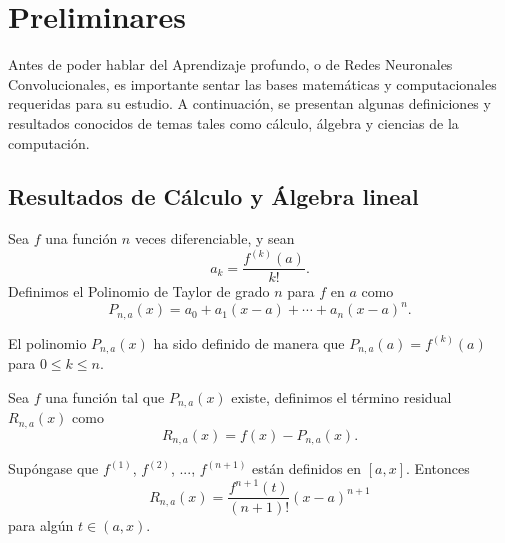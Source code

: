     \chapter{Preliminares}
    Antes de poder hablar del Aprendizaje profundo, o de Redes Neuronales Convolucionales, es importante sentar las bases matemáticas y computacionales requeridas para su estudio. A continuación, se presentan algunas definiciones y resultados conocidos de temas tales como cálculo, álgebra y ciencias de la computación.
    \section{Resultados de Cálculo y Álgebra lineal}
    \begin{definition}
        Sea $f$ una función $n$ veces diferenciable, y sean $$a_k = \frac{f^{(k)}(a)}{k!}.$$
        Definimos el Polinomio de Taylor de grado $n$ para $f$ en $a$ como
        $$P_{n,a}(x) = a_0 + a_1(x-a) + \cdots + a_n(x-a)^n.$$
    \end{definition}
    El polinomio $P_{n,a}(x)$ ha sido definido de manera que $P_{n,a}(a) = f^{(k)}(a)$ para $0\leq k \leq n$.
    \begin{definition}
        Sea $f$ una función tal que $P_{n,a}(x)$ existe, definimos el término  residual $R_{n,a}(x)$ como 
        \begin{equation}
            R_{n,a}(x) = f(x) - P_{n,a}(x).
        \end{equation} 
    \end{definition}
    \begin{theorem}
        Supóngase que $f^{(1)}$, $f^{(2)}$, ..., $f^{(n+1)}$ están definidos en $[a,x]$. Entonces 
        \begin{equation}
            R_{n,a}(x) = \frac{f^{n+1}(t)}{(n+1)!}(x-a)^{n+1}
        \end{equation}
        para algún $t\in (a,x)$.
    \end{theorem}

